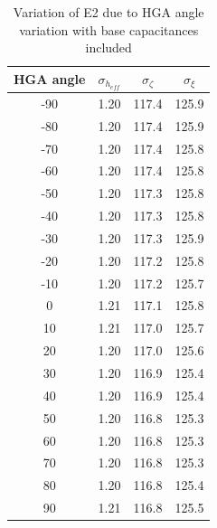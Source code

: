 \documentclass[a4paper,10pt]{thesis}
\begin{document}
\newpage
\begin{table}
\centering
\caption{Variation of E2 due to HGA angle variation with base capacitances included}\label{tab_e12var}
\begin{tabular}{|c|c|c|c|}
  \hline
HGA angle & $\sigma_{h_{eff}}$ & $\sigma_{\zeta}$ & $\sigma_{\xi}$ \\
\hline
-90 & 1.20 & 117.4 & 125.9 \\
-80 & 1.20 & 117.4 & 125.9 \\
-70 & 1.20 & 117.4 & 125.8 \\
-60 & 1.20 & 117.4 & 125.8 \\
-50 & 1.20 & 117.3 & 125.8 \\
-40 & 1.20 & 117.3 & 125.8 \\
-30 & 1.20 & 117.3 & 125.9 \\
-20 & 1.20 & 117.2 & 125.8 \\
-10 & 1.20 & 117.2 & 125.7 \\
0 & 1.21 & 117.1 & 125.8 \\
10 & 1.21 & 117.0 & 125.7 \\
20 & 1.20 & 117.0 & 125.6 \\
30 & 1.20 & 116.9 & 125.4 \\
40 & 1.20 & 116.9 & 125.4 \\
50 & 1.20 & 116.8 & 125.3 \\
60 & 1.20 & 116.8 & 125.3 \\
70 & 1.20 & 116.8 & 125.3 \\
80 & 1.20 & 116.8 & 125.4 \\
90 & 1.21 & 116.8 & 125.5 \\
\hline\end{tabular}
\end{table}
\end{document}
